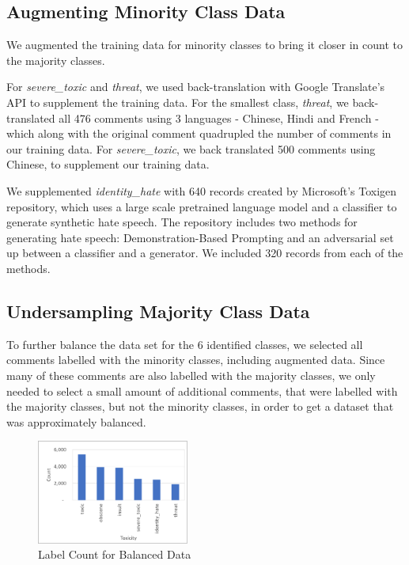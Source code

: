 \documentclass[11pt,a4paper]{article}
\begin{document}
\subsection{Augmenting Minority Class Data}
We augmented the training data for minority classes to bring it closer in count to the majority classes.

For \emph{severe\_toxic} and \emph{threat}, we used back-translation with Google Translate's API to supplement the training data.  For the smallest class, \emph{threat}, we back-translated all 476 comments using 3 languages - Chinese, Hindi and French - which along with the original comment quadrupled the number of comments in our training data.  For \emph{severe\_toxic}, we back translated 500 comments using Chinese, to supplement our training data.

We supplemented \emph{identity\_hate} with 640 records created by Microsoft's Toxigen repository, which uses a large scale pretrained language model and a classifier to generate synthetic hate speech.  The repository includes two methods for generating hate speech:  Demonstration-Based Prompting and an adversarial set up between a classifier and a generator.  We included 320 records from each of the methods.

\subsection{Undersampling Majority Class Data}
To further balance the data set for the 6 identified classes, we selected all comments labelled with the minority classes, including augmented data.  Since many of these comments are also labelled with the majority classes, we only needed to select a small amount of additional comments, that were labelled with the majority classes, but not the minority classes, in order to get a dataset that was approximately balanced.


\begin{figure}[h!]
\centering
\includegraphics[width=50mm,scale=0.5]{label_counts_balanced.png}
\caption{Label Count for Balanced Data}
\label{Fig2. label count vs toxicity}
\end{figure}
\end{document}
